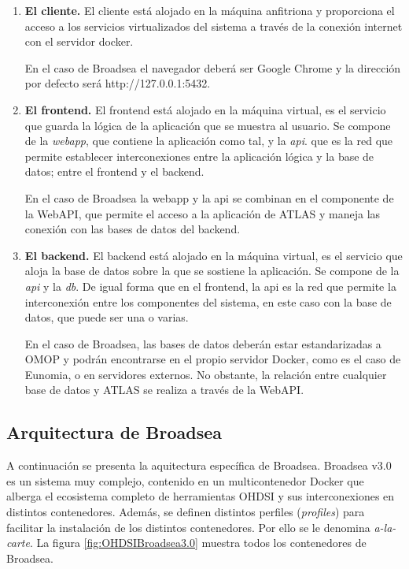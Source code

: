 \begin{enumerate}

    \item \textbf{El cliente.} El cliente está alojado en la máquina anfitriona y proporciona el acceso a los servicios virtualizados del sistema a través de la conexión internet con el servidor docker.

     En el caso de Broadsea el navegador deberá ser Google Chrome y la dirección por defecto será http://127.0.0.1:5432.

    \item \textbf{El frontend.} El frontend está alojado en la máquina virtual, es el servicio que guarda la lógica de la aplicación que se muestra al usuario. Se compone de la \textit{webapp}, que contiene la aplicación como tal, y la \textit{api}. que es la red que permite establecer interconexiones entre la aplicación lógica y la base de datos; entre el frontend y el backend.

    En el caso de Broadsea la webapp y la api se combinan en el componente de la WebAPI, que permite el acceso a la aplicación de ATLAS y maneja las conexión con las bases de datos del backend.

    \item \textbf{El backend.} El backend está alojado en la máquina virtual, es el servicio que aloja la base de datos sobre la que se sostiene la aplicación. Se compone de la \textit{api} y la \textit{db}. De igual forma que en el frontend, la api es la red que permite la interconexión entre los componentes del sistema, en este caso con la base de datos, que puede ser una o varias.

    En el caso de Broadsea, las bases de datos deberán estar estandarizadas a OMOP y podrán encontrarse en el propio servidor Docker, como es el caso de Eunomia, o en servidores externos. No obstante, la relación entre cualquier base de datos y ATLAS se realiza a través de la WebAPI.

    
\end{enumerate}

\subsection{Arquitectura de Broadsea} \label{subsec:07Broadsea}


A continuación se presenta la aquitectura específica de Broadsea. Broadsea v3.0 es un sistema muy complejo, contenido en un multicontenedor Docker que alberga el ecosistema completo de herramientas OHDSI y sus interconexiones en distintos contenedores. Además, se definen distintos perfiles (\textit{profiles}) para facilitar la instalación de los distintos contenedores. Por ello se le denomina \textit{a-la-carte}. La figura \ref{fig:OHDSIBroadsea3.0} muestra todos los contenedores de Broadsea.

